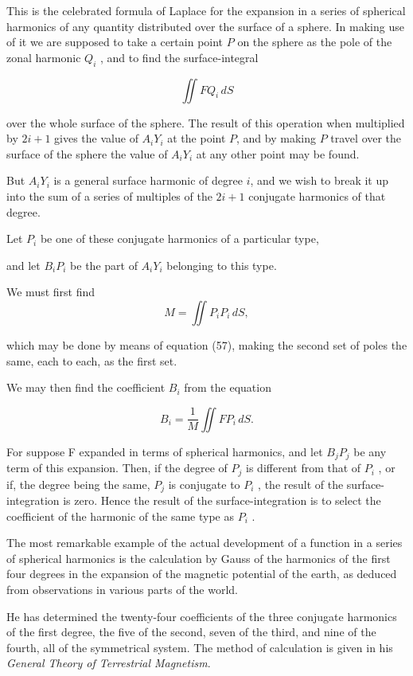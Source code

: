 \documentclass[11pt,a4paper]{article}
\begin{document}
This is the celebrated formula of Laplace for the expansion in a series of spherical harmonics of any quantity distributed over the surface of a sphere. In making use of it we are supposed to take a certain point $P$ on the sphere as the pole of the zonal harmonic  $Q_i$ , and to find the surface-integral

\[
\iint FQ_i\,dS
\]

over the whole surface of the sphere. The result of this operation when multiplied by $2i+1$ gives the value of  $A_iY_i$  at the point $P$, and by making $P$ travel over the surface of the sphere the value of  $A_iY_i$  at any other point may be found.

But  $A_iY_i$  is a general surface harmonic of degree $i$, and we wish to break it up into the sum of a series of multiples of the $2i+1$ conjugate harmonics of that degree.

Let  $P_i$  be one of these conjugate harmonics of a particular type,

and let  $B_i P_i$  be the part of  $A_i Y_i$  belonging to this type.

We must first find 
\begin{equation}\tag{64}
M=\iint P_iP_i\,dS,
\end{equation}

which may be done by means of equation (57), making the second set of poles the same, each to each, as the first set.

We may then find the coefficient  $B_i$  from the equation

\begin{equation}\tag{65}
B_i=\frac{1}{M}\iint FP_i\,dS.
\end{equation}

For suppose F expanded in terms of spherical harmonics, and let  $B_j P_j$  be any term of this expansion. Then, if the degree of  $P_j$  is different from that of  $P_i$ , or if, the degree being the same,  $P_j$  is conjugate to  $P_i$ , the result of the surface-integration is zero. Hence the result of the surface-integration is to select the coefficient of the harmonic of the same type as  $P_i$ .

The most remarkable example of the actual development of a function in a series of spherical harmonics is the calculation by Gauss of the harmonics of the first four degrees in the expansion of the magnetic potential of the earth, as deduced from observations in various parts of the world.

He has determined the twenty-four coefficients of the three conjugate harmonics of the first degree, the five of the second, seven of the third, and nine of the fourth, all of the symmetrical system. The method of calculation is given in his \emph{General Theory of Terrestrial Magnetism}.
\end{document}
